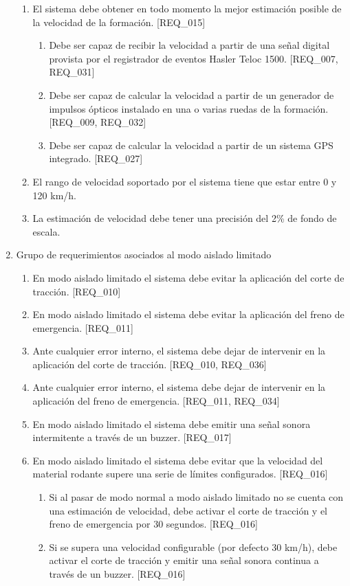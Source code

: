 \documentclass[11pt]{charter}
\begin{document}
\begin{enumerate}
\begin{enumerate}
  \item El sistema debe obtener en todo momento la mejor estimación posible de la velocidad de la formación. [REQ\_015]
    \begin{enumerate}
    \item Debe ser capaz de recibir la velocidad a partir de una señal digital provista por el registrador de eventos Hasler Teloc 1500.  [REQ\_007, REQ\_031]
    \item Debe ser capaz de calcular la velocidad a partir de un generador de impulsos ópticos instalado en una o varias ruedas de la formación. [REQ\_009, REQ\_032]
    \item Debe ser capaz de calcular la velocidad a partir de un sistema GPS integrado. [REQ\_027]
    \end{enumerate}
  \item El rango de velocidad soportado por el sistema tiene que estar entre 0 y 120 km/h.
  \item La estimación de velocidad debe tener una precisión del 2\% de fondo de escala. 
  \end{enumerate}
\item Grupo de requerimientos asociados al modo aislado limitado
  \begin{enumerate}
  \item En modo aislado limitado el sistema debe evitar la aplicación del corte de tracción. [REQ\_010]
  \item En modo aislado limitado el sistema debe evitar la aplicación del freno de emergencia. [REQ\_011]
  \item Ante cualquier error interno, el sistema debe dejar de intervenir en la aplicación del corte de tracción. [REQ\_010, REQ\_036]
  \item Ante cualquier error interno, el sistema debe dejar de intervenir en la aplicación del freno de emergencia. [REQ\_011, REQ\_034]
  \item En modo aislado limitado el sistema debe emitir una señal sonora intermitente a través de un buzzer. [REQ\_017]
  \item En modo aislado limitado el sistema debe evitar que la velocidad del material rodante supere una serie de límites configurados. [REQ\_016]
    \begin{enumerate}
    \item Si al pasar de modo normal a modo aislado limitado no se cuenta con una estimación de velocidad, debe activar el corte de tracción y el freno de emergencia por 30 segundos. [REQ\_016]
    \item Si se supera una velocidad configurable (por defecto 30 km/h), debe activar el corte de tracción y emitir una señal sonora continua a través de un buzzer. [REQ\_016]

\end{enumerate}
\end{enumerate}
\end{enumerate}
\end{document}

